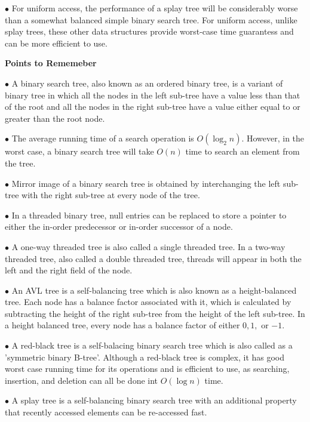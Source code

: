 \vskip 3mm
\qquad$\bullet$ For uniform access, the performance of a splay tree will be considerably worse than a somewhat balanced simple binary search tree. For uniform access, unlike splay trees, these other data structures provide worst-case time guarantess and can be more efficient to use.

\filbreak
\vskip 1cm
{\bf Points to Rememeber}

\vskip 3mm
\qquad$\bullet$ A binary search tree, also known as an ordered binary tree, is a variant of binary tree in which all the nodes in the left sub-tree have a value less than that of the root and all the nodes in the right sub-tree have a value either equal to or greater than the root node.

\vskip 3mm
\qquad$\bullet$ The average running time of a search operation is $O(\log_2 n)$. However, in the worst case, a binary search tree will take $O(n)$ time to search an element from the tree.

\vskip 3mm
\qquad$\bullet$ Mirror image of a binary search tree is obtained by interchanging the left sub-tree with the right sub-tree at every node of the tree.

\vskip 3mm
\qquad$\bullet$ In a threaded binary tree, null entries can be replaced to store a pointer to either the in-order predecessor or in-order successor of a node.

\vskip 3mm
\qquad$\bullet$ A one-way threaded tree is also called a single threaded tree. In a two-way threaded tree, also called a double threaded tree, threads will appear in both the left and the right field of the node.

\vskip 3mm
\qquad$\bullet$ An AVL tree is a self-balancing tree which is also known as a height-balanced tree. Each node has a balance factor associated with it, which is calculated by subtracting the height of the right sub-tree from the height of the left sub-tree. In a height balanced tree, every node has a balance factor of either $0, 1,$ or $-1$.

\vskip 3mm
\qquad$\bullet$ A red-black tree is a self-balacing binary search tree which is also called as a 'symmetric binary B-tree'. Although a red-black tree is complex, it has good worst case running time for its operations and is efficient to use, as searching, insertion, and deletion can all be done int $O(\log n)$ time.

\vskip 3mm
\qquad$\bullet$ A splay tree is a self-balancing binary search tree with an additional property that recently accessed elements can be re-accessed fast.


\vfill\eject
\bye
